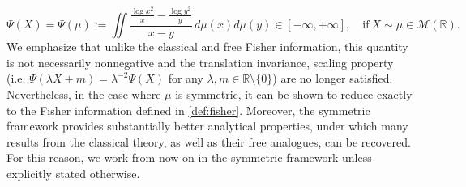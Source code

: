 \documentclass[10pt, reqno]{amsart}
\numberwithin{equation}{section}
\theoremstyle{definition}
\theoremstyle{plain}
\theoremstyle{remark}
\newcommand{\R}{\mathbb{R}}
\newcommand{\1}{\mathbbm{1}}
\newcommand{\probmr}{\mathcal{M}(\R)}
\begin{document}
	\begin{equation*}
		\Psi(X)=\Psi(\mu):=\iint \frac{\frac{\log x^2}{x}-\frac{\log y^2}{y}}{x-y}\,d\mu(x)d\mu(y)\in [-\infty,+\infty],\quad \text{if}\ X\sim \mu\in \probmr.
	\end{equation*}
	We emphasize that unlike the classical and free Fisher information, this quantity is not necessarily nonnegative and the translation invariance, scaling property (i.e.  $\Psi(\lambda X+m)=\lambda^{-2}\Psi(X)$ for any $\lambda, m\in \R\setminus\{0\}$) are no longer satisfied. Nevertheless, in the case where $\mu$ is symmetric, it can be shown to reduce exactly to the Fisher information defined in \eqref{def:fisher}. Moreover, the symmetric framework provides substantially better analytical properties, under which many results from the classical theory, as well as their free analogues, can be recovered. For this reason, we work from now on in the symmetric framework unless explicitly stated otherwise.
\end{document}
